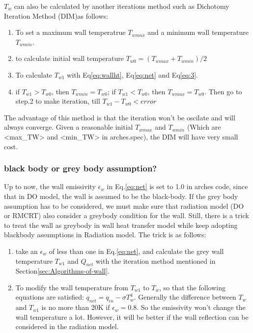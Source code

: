 $T_w$ can also be calculated by another iterations method such as
Dichotomy Iteration Method (DIM)as follows:
\begin{enumerate}
\item To set a maximum wall temperatrue $T_{wmax}$ and a minimum wall temperature
$T_{wmin}$.
\item to calculate initial wall temperature $T_{w0}=(T_{wmax}+T_{wmin})/2$
\item To calculate $T_{w1}$ with Eq\ref{eq:wallht}, Eq\ref{eq:net} and
Eq\ref{eq:3}.
\item if $T_{w1}>T_{w0}$, then $T_{wmin}=T_{w0}$; if $T_{w1}<T_{w0}$,
then $T_{wmax}=T_{w0}$. Then go to step.2 to make iteration, till
$T_{w1}-T_{w0}<error$
\end{enumerate}
The advantage of this method is that the iteration won't be oscilate
and will always converge. Given a reasonable initial $T_{wmax}$ and
$T_{wmin}$ (Which are <max\_TW> and <min\_TW> in arches.spec), the
DIM will have very small cost. 

\subsubsection{black body or grey body assumption?}

Up to now, the wall emissivity $\epsilon_{w}$ in Eq.\ref{eq:net}
is set to 1.0 in arches code, since that in DO model, the wall is
assumed to be the black-body. If the grey body assumption has to be
considered, we must make sure that radiation model (DO or RMCRT) also
consider a greybody condition for the wall. Still, there is a trick
to treat the wall as greybody in wall heat transfer model while keep
adopting blackbody assumptions in Radiation model. The trick is as
follows:
\begin{enumerate}
\item take an $\epsilon_{w}$ of less than one in Eq.\ref{eq:net}, and
calculate the grey wall temperature $T_{w1}$ and $Q_{net}$ with
the iteration method mentioned in Section\ref{sec:Algorithms-of-wall}.
\item To modify the wall temperature from $T_{w1}$ to $T_w$,  so that
the following equations are satisfied: $q_{net}=q_{in}-\sigma T_{w}^{4}$.
Generally the difference between $T_w$ and $T_{w1}$ is no more than
20K if $\epsilon_{w}=0.8$. So the emissivity won't change the wall
temperature a lot. However, it will be better if the wall reflection
can be considered in the radiation model.
\end{enumerate}

